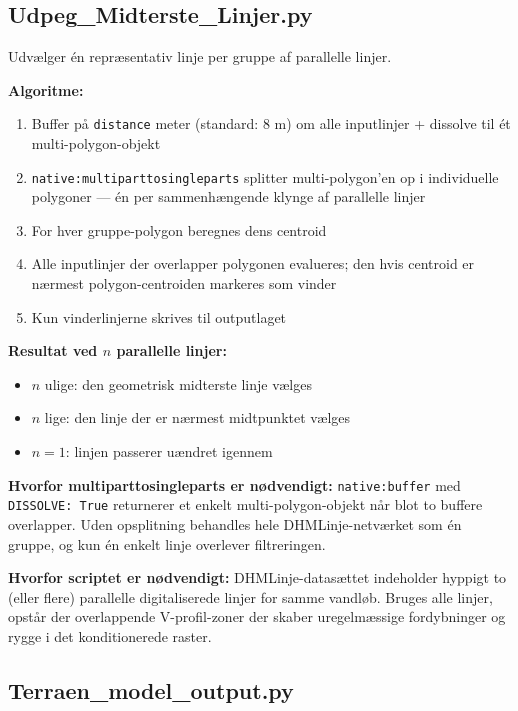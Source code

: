 \subsection{Udpeg\_Midterste\_Linjer.py}
\label{sec:midterste_linjer}

Udvælger én repræsentativ linje per gruppe af parallelle linjer.

\textbf{Algoritme:}
\begin{enumerate}
  \item Buffer på \texttt{distance} meter (standard: 8 m) om alle inputlinjer
        + dissolve til ét multi-polygon-objekt
  \item \texttt{native:multiparttosingleparts} splitter multi-polygon'en op i
        individuelle polygoner — én per sammenhængende klynge af parallelle linjer
  \item For hver gruppe-polygon beregnes dens centroid
  \item Alle inputlinjer der overlapper polygonen evalueres; den hvis centroid
        er nærmest polygon-centroiden markeres som vinder
  \item Kun vinderlinjerne skrives til outputlaget
\end{enumerate}

\textbf{Resultat ved $n$ parallelle linjer:}
\begin{itemize}
  \item $n$ ulige: den geometrisk midterste linje vælges
  \item $n$ lige: den linje der er nærmest midtpunktet vælges
  \item $n = 1$: linjen passerer uændret igennem
\end{itemize}

\textbf{Hvorfor multiparttosingleparts er nødvendigt:} \texttt{native:buffer}
med \texttt{DISSOLVE: True} returnerer et enkelt multi-polygon-objekt når blot
to buffere overlapper. Uden opsplitning behandles hele DHMLinje-netværket som
én gruppe, og kun én enkelt linje overlever filtreringen.

\textbf{Hvorfor scriptet er nødvendigt:} DHMLinje-datasættet indeholder hyppigt
to (eller flere) parallelle digitaliserede linjer for samme vandløb. Bruges alle
linjer, opstår der overlappende V-profil-zoner der skaber uregelmæssige
fordybninger og rygge i det konditionerede raster.

\subsection{Terraen\_model\_output.py}

